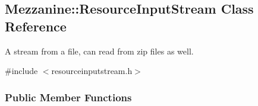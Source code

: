 \hypertarget{classMezzanine_1_1ResourceInputStream}{
\subsection{Mezzanine::ResourceInputStream Class Reference}
\label{classMezzanine_1_1ResourceInputStream}
}


A stream from a file, can read from zip files as well.  




{\ttfamily \#include $<$resourceinputstream.h$>$}

\subsubsection*{Public Member Functions}
